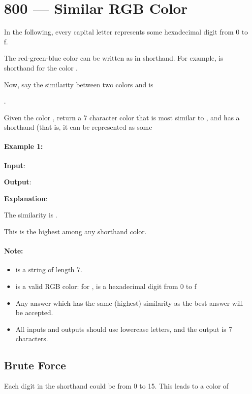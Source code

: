 \section{800 --- Similar RGB Color}
In the following, every capital letter represents some hexadecimal digit from 0 to f.

The red-green-blue color  can be written as  in shorthand.  For example,  is shorthand for the color .

Now, say the similarity between two colors  and  is 

.

Given the color , return a 7 character color that is most similar to , and has a shorthand (that is, it can be represented as some 

\paragraph{Example 1:}

\begin{flushleft}
\textbf{Input}: 

\textbf{Output}: 

\textbf{Explanation}:  

The similarity is .

This is the highest among any shorthand color.
\end{flushleft}

\paragraph{Note:}

\begin{itemize}
\item {} is a string of length 7.
\item {} is a valid RGB color: for ,  is a hexadecimal digit from 0 to f
\item Any answer which has the same (highest) similarity as the best answer will be accepted.
\item All inputs and outputs should use lowercase letters, and the output is 7 characters.
\end{itemize}

\subsection{Brute Force}
Each digit in the shorthand  could be from 0 to 15. This leads to a color of 

